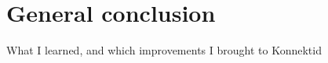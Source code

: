 \section{General conclusion}
\label{sec:conclusion}

What I learned, and which improvements I brought to Konnektid
